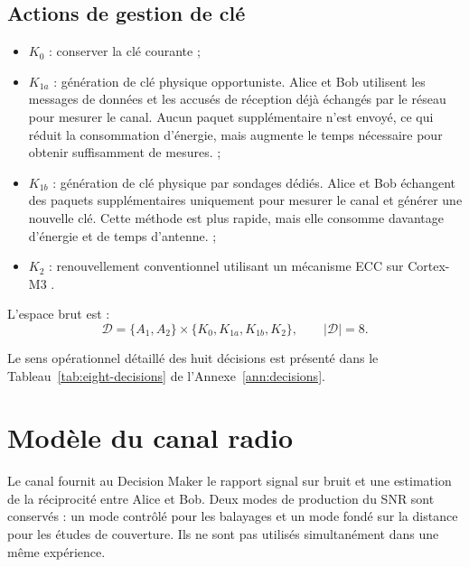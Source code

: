 \documentclass[conference,a4paper]{IEEEtran}
\begin{document}
\subsection{Actions de gestion de clé}
\begin{itemize}
    \item $K_0$ : conserver la clé courante ;
    \item $K_{1a}$ : génération de clé physique opportuniste. 
    Alice et Bob utilisent les messages de données et les accusés de réception
    déjà échangés par le réseau pour mesurer le canal. Aucun paquet supplémentaire
    n’est envoyé, ce qui réduit la consommation d’énergie, mais augmente le temps
    nécessaire pour obtenir suffisamment de mesures. \cite{zhang2018} ;
    \item $K_{1b}$ : génération de clé physique par sondages dédiés.
    Alice et Bob échangent des paquets supplémentaires uniquement pour mesurer
    le canal et générer une nouvelle clé. Cette méthode est plus rapide, mais elle
    consomme davantage d’énergie et de temps d’antenne. \cite{ruotsalainen2018,ruotsalainen2020} ;
    \item $K_2$ : renouvellement conventionnel utilisant un mécanisme ECC sur Cortex-M3 \cite{mossinger2016}.
\end{itemize}

L'espace brut est :
\begin{equation}
\mathcal{D}=\{A_1,A_2\}\times\{K_0,K_{1a},K_{1b},K_2\},\qquad |\mathcal{D}|=8.
\label{eq:decision-space}
\end{equation}


Le sens opérationnel détaillé des huit décisions est présenté dans le Tableau~\ref{tab:eight-decisions} de l'Annexe~\ref{ann:decisions}.



\section{Modèle du canal radio}
\label{sec:canal_radio}

Le canal fournit au Decision Maker le rapport signal sur bruit et une estimation de la réciprocité entre Alice et Bob. Deux modes de production du SNR sont conservés : un mode contrôlé pour les balayages et un mode fondé sur la distance pour les études de couverture. Ils ne sont pas utilisés simultanément dans une même expérience.
\end{document}
